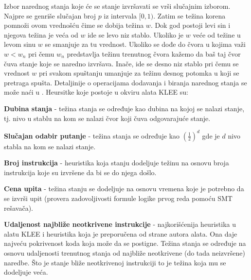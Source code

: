 \documentclass[12pt,oneside]{memoir}
\begin{document}
Izbor narednog stanja koje će se stanje izvršavati se vrši slučajnim izborom. Najpre se genriše slučajan broj $p$ iz intervala $[0, 1)$. Zatim se težina korena pomnoži ovom vrednošću čime se dobija težina $w$. Dok god postoji levi sin i njegova težina je veća od $w$ ide se levo niz stablo. Ukoliko je $w$ veće od težine u levom sinu $w$ se smanjuje za tu vrednost. Ukoliko se dođe do čvora u kojima važi $w < w_n$ pri čemu $w_n$ predstavlja težinu trenutnog čvora kažemo da baš taj čvor čuva stanje koje se naredno izvršava. Inače, ide se desno niz stablo pri čemu se vrednost $w$ pri svakom spuštanju umanjuje za težinu desnog potomka u koji se pretraga spušta. Detaljinije o operacijama dodavanja i biranja narednog stanja se može naći u \cite{klee}. Heursitke koje postoje u okviru alata KLEE su:
\begin{description}
    \item\textbf{Dubina stanja} - težina stanja se određuje kao dubina na kojoj se nalazi stanje, tj. nivo u stablu na kom se nalazi čvor koji čuva odgovarajuće stanje.
    
    \item\textbf{Slučajan odabir putanje} - težina stanja se određuje kao $(\frac{1}{2}) ^ d$ gde je $d$ nivo stabla na kom se nalazi stanje.
    
    \item\textbf{Broj instrukcija} - heuristika koja stanju dodeljuje težinu na osnovu broja instrukcija koje su izvršene da bi se do njega došlo.
    
    \item\textbf{Cena upita} - težina stanju se dodeljuje na osnovu vremena koje je potrebno da se izvrši upit (provera zadovoljivosti formule logike prvog reda pomoću SMT rešavača).
    
    \item\textbf{Udaljenost najbliže neotkrivene instrukcije} - najkorišćenija heuristika u alatu KLEE i heuristika koja je preporučena od strane autora alata. Ona daje najveću pokrivenost koda koja može da se postigne. Težina stanja se određuje na osnovu udaljenosti trenutnog stanja od najbliže neotkrivene (do tada neizvršene) naredbe. Što je stanje bliže neotkrivenoj instrukciji to je težina koja mu se dodeljuje veća. 
\end{description}

\bigskip
\end{document}
